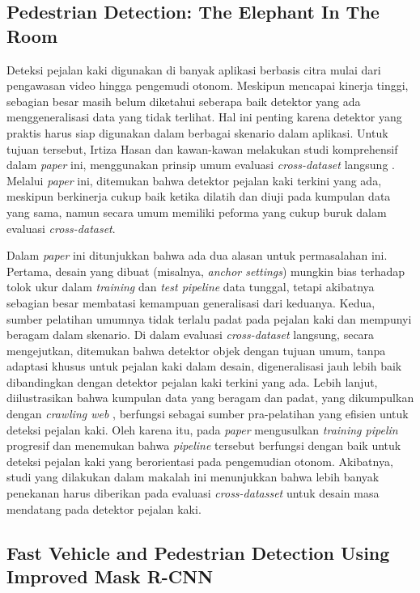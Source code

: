 \subsection{Pedestrian Detection: The Elephant In The Room}
\label{pedestrian-detection}

Deteksi pejalan kaki digunakan di banyak aplikasi berbasis citra mulai dari pengawasan video hingga pengemudi otonom. Meskipun mencapai kinerja tinggi, sebagian besar masih belum diketahui seberapa baik detektor yang ada menggeneralisasi data yang tidak terlihat. Hal ini penting karena detektor yang praktis harus siap digunakan dalam berbagai skenario dalam aplikasi. Untuk tujuan tersebut, Irtiza Hasan dan kawan-kawan melakukan studi komprehensif dalam \textit{paper} ini, menggunakan prinsip umum evaluasi \textit{cross-dataset} langsung \citep{pedestrian-detection}. Melalui \textit{paper} ini, ditemukan bahwa detektor pejalan kaki terkini yang ada, meskipun berkinerja cukup baik ketika dilatih dan diuji pada kumpulan data yang sama, namun secara umum memiliki peforma yang cukup buruk dalam evaluasi \textit{cross-dataset}. 

Dalam \textit{paper} ini ditunjukkan bahwa ada dua alasan untuk permasalahan ini. Pertama, desain yang dibuat (misalnya, \textit{anchor settings}) mungkin bias terhadap tolok ukur dalam \textit{training} dan \textit{test pipeline} data tunggal, tetapi akibatnya sebagian besar membatasi kemampuan generalisasi dari keduanya. Kedua, sumber pelatihan umumnya tidak terlalu padat pada pejalan kaki dan mempunyi beragam dalam skenario. Di dalam evaluasi \textit{cross-dataset} langsung, secara mengejutkan, ditemukan bahwa detektor objek dengan tujuan umum, tanpa adaptasi khusus untuk pejalan kaki dalam desain, digeneralisasi jauh lebih baik dibandingkan dengan detektor pejalan kaki terkini yang ada. Lebih lanjut, diilustrasikan bahwa kumpulan data yang beragam dan padat, yang dikumpulkan dengan \textit{crawling web} , berfungsi sebagai sumber pra-pelatihan yang efisien untuk deteksi pejalan kaki. Oleh karena itu, pada \textit{paper} mengusulkan \textit{training pipelin} progresif dan menemukan bahwa \textit{pipeline} tersebut berfungsi dengan baik untuk deteksi pejalan kaki yang berorientasi pada pengemudian otonom. Akibatnya, studi yang dilakukan dalam makalah ini menunjukkan bahwa lebih banyak penekanan harus diberikan pada evaluasi \textit{cross-datasset} untuk desain masa mendatang pada detektor pejalan kaki.

\subsection{Fast Vehicle and Pedestrian Detection Using Improved Mask R-CNN}
\label{fast-vehicle}

